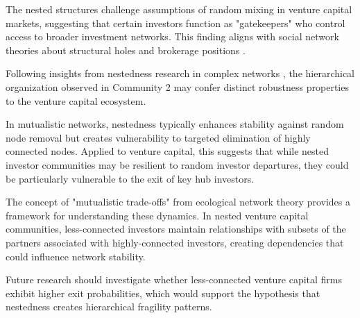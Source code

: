 The nested structures challenge assumptions of random mixing in venture capital markets, suggesting that certain investors function as "gatekeepers" who control access to broader investment networks. This finding aligns with social network theories about structural holes and brokerage positions \cite{Borgatti2011}.

Following insights from nestedness research in complex networks \cite{Mariani2019}, the hierarchical organization observed in Community 2 may confer distinct robustness properties to the venture capital ecosystem. 

In mutualistic networks, nestedness typically enhances stability against random node removal but creates vulnerability to targeted elimination of highly connected nodes. Applied to venture capital, this suggests that while nested investor communities may be resilient to random investor departures, they could be particularly vulnerable to the exit of key hub investors.

The concept of "mutualistic trade-offs" from ecological network theory provides a framework for understanding these dynamics. In nested venture capital communities, less-connected investors maintain relationships with subsets of the partners associated with highly-connected investors, creating dependencies that could influence network stability. 

Future research should investigate whether less-connected venture capital firms exhibit higher exit probabilities, which would support the hypothesis that nestedness creates hierarchical fragility patterns.
